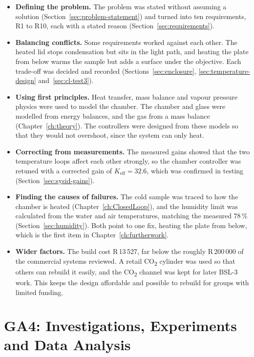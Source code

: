 \begin{itemize}[nosep]
    \item \textbf{Defining the problem.} The problem was stated without assuming a solution (Section~\ref{sec:problem-statement}) and turned into ten requirements, R1 to R10, each with a stated reason (Section~\ref{sec:requirements}).
    \item \textbf{Balancing conflicts.} Some requirements worked against each other. The heated lid stops condensation but sits in the light path, and heating the plate from below warms the sample but adds a surface under the objective. Each trade-off was decided and recorded (Sections~\ref{sec:enclosure}, \ref{sec:temperature-design} and~\ref{sec:cl-test3}).
    \item \textbf{Using first principles.} Heat transfer, mass balance and vapour pressure physics were used to model the chamber. The chamber and glass were modelled from energy balances, and the gas from a mass balance (Chapter~\ref{ch:theory}). The controllers were designed from these models so that they would not overshoot, since the system can only heat.
    \item \textbf{Correcting from measurements.} The measured gains showed that the two temperature loops affect each other strongly, so the chamber controller was retuned with a corrected gain of $K_\mathrm{eff} = 32.6$, which was confirmed in testing (Section~\ref{sec:sysid-gains}).
    \item \textbf{Finding the causes of failures.} The cold sample was traced to how the chamber is heated (Chapter~\ref{ch:ClosedLoop}), and the humidity limit was calculated from the water and air temperatures, matching the measured 78\,\% (Section~\ref{sec:humidity}). Both point to one fix, heating the plate from below, which is the first item in Chapter~\ref{ch:furtherwork}.
    \item \textbf{Wider factors.} The build cost R\,13\,527, far below the roughly R\,200\,000 of the commercial systems reviewed. A retail CO\textsubscript{2} cylinder was used so that others can rebuild it easily, and the CO\textsubscript{2} channel was kept for later BSL-3 work. This keeps the design affordable and possible to rebuild for groups with limited funding.
\end{itemize}

\section{GA4: Investigations, Experiments and Data Analysis}
\label{app:ga4}

